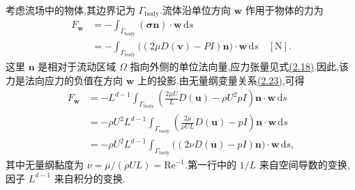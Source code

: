 \begin{note}[流动作用于物体的力]\label{note:appendix-d-2}
考虑流场中的物体,其边界记为 $\Gamma_{\mathrm{body}}$.流体沿单位方向 $\bm w$ 作用于物体的力为
\[
\begin{aligned}
 F_{\bm w}
 &=-\int_{\Gamma_{\mathrm{body}}}(\symbf{\sigma}\bm n)\cdot\bm w\,\mathrm ds\\
 &=-\int_{\Gamma_{\mathrm{body}}}
   \bigl((2\mu D(\bm v)-P I)\bm n\bigr)\cdot\bm w\,\mathrm ds
   \quad[\mathrm N].
\end{aligned}
\]
这里 $\bm n$ 是相对于流动区域 $\Omega$ 指向外侧的单位法向量,应力张量见式\hyperref[eq:dimensionless-stress-tensor]{(2.18)}.因此,该力是法向应力的负值在方向 $\bm w$ 上的投影.由无量纲变量关系\hyperref[eq:dimensionless-parameters]{(2.23)},可得
\begin{equation}\label{eq:appendix-d-1}
\begin{aligned}
F_{\bm w}
 &=-L^{d-1}\int_{\Gamma_{\mathrm{body}}}
 \left(\frac{2\mu U}{L}D(\bm u)-\rho U^2pI\right)\bm n\cdot\bm w\,\mathrm ds\\
 &=-\rho U^2L^{d-1}\int_{\Gamma_{\mathrm{body}}}
 \left(\frac{2\mu}{\rho UL}D(\bm u)-pI\right)\bm n\cdot\bm w\,\mathrm ds\\
 &=-\rho U^2L^{d-1}\int_{\Gamma_{\mathrm{body}}}
 \bigl((2\nu D(\bm u)-pI)\bm n\bigr)\cdot\bm w\,\mathrm ds ,
\end{aligned}
\end{equation}
其中无量纲黏度为 $\nu=\mu/(\rho UL)=\mathrm{Re}^{-1}$.第一行中的 $1/L$ 来自空间导数的变换,因子 $L^{d-1}$ 来自积分的变换.


\end{note}
